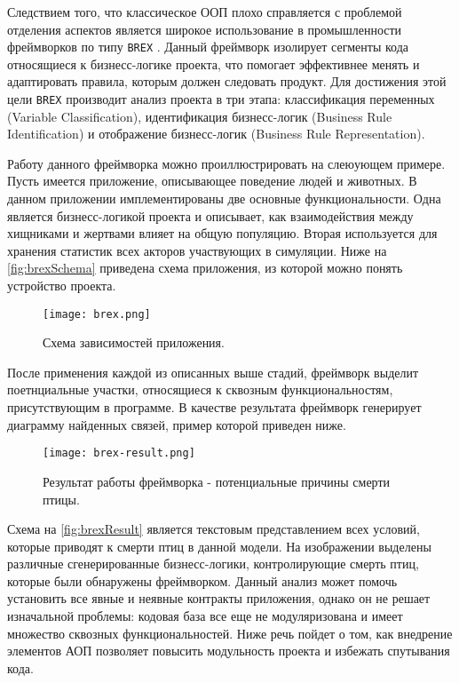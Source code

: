 Следствием того, что классическое ООП плохо справляется с проблемой отделения аспектов является широкое использование в промышленности фреймворков по типу \texttt{BREX} \cite{brex}. Данный фреймворк изолирует сегменты кода относящиеся к бизнесс-логике проекта, что помогает эффективнее менять и адаптировать правила, которым должен следовать продукт. Для достижения этой цели \texttt{BREX} производит анализ проекта в три этапа: классификация переменных (Variable Classification), идентификация бизнесс-логик (Business Rule Identification) и отображение бизнесс-логик (Business Rule Representation).

Работу данного фреймворка можно проиллюстрировать на слеюующем примере. Пусть имеется приложение, описывающее поведение людей и животных. В данном приложении имплементированы две основные функциональности. Одна является бизнесс-логикой проекта и описывает, как взаимодействия между хищниками и жертвами влияет на общую популяцию. Вторая используется для хранения статистик всех акторов участвующих в симуляции. Ниже на \autoref{fig:brexSchema} приведена схема приложения, из которой можно понять устройство проекта.

\begin{figure}[h]
\centering
\texttt{[image: brex.png]}
\caption{Схема зависимостей приложения.}
\label{fig:brexSchema}
\end{figure}

После применения каждой из описанных выше стадий, фреймворк выделит поетнциальные участки, относящиеся к сквозным функциональностям, присутствующим в программе. В качестве результата фреймворк генерирует диаграмму найденных связей, пример которой приведен ниже.

\begin{figure}[h]
\centering
\texttt{[image: brex-result.png]}
\caption{Результат работы фреймворка - потенциальные причины смерти птицы.}
\label{fig:brexResult}
\end{figure}

Схема на \autoref{fig:brexResult} является текстовым представлением всех условий, которые приводят к смерти птиц в данной модели. На изображении выделены различные сгенерированные бизнесс-логики, контролирующие смерть птиц, которые были обнаружены фреймворком. Данный анализ может помочь установить все явные и неявные контракты приложения, однако он не решает изначальной проблемы: кодовая база все еще не модуляризована и имеет множество сквозных функциональностей. Ниже речь пойдет о том, как внедрение элементов АОП позволяет повысить модульность проекта и избежать спутывания кода.


